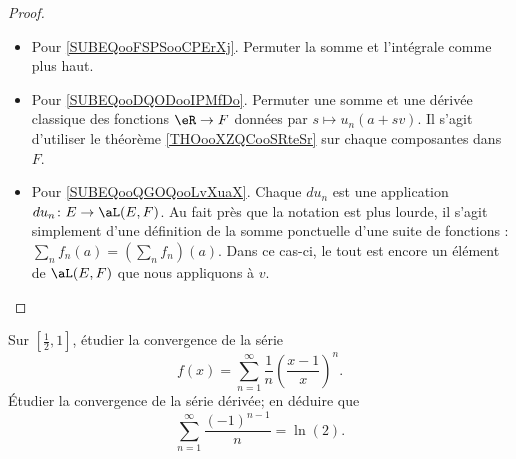 \begin{proof}
\begin{subproof}
\begin{itemize}
			\item Pour \ref{SUBEQooFSPSooCPErXj}. Permuter la somme et l'intégrale comme plus haut.
			\item Pour \ref{SUBEQooDQODooIPMfDo}. Permuter une somme et une dérivée classique des fonctions \( \eR\to F\) données par \( s\mapsto u_n(a+sv)\). Il s'agit d'utiliser le théorème \ref{THOooXZQCooSRteSr} sur chaque composantes dans \( F\).
			\item Pour \ref{SUBEQooQGOQooLvXuaX}. Chaque \( du_n\) est une application \( du_n\colon E\to \aL(E,F)\). Au fait près que la notation est plus lourde, il s'agit simplement d'une définition de la somme ponctuelle d'une suite de fonctions : \( \sum_nf_n(a)=(\sum_nf_n)(a)\). Dans ce cas-ci, le tout est encore un élément de \( \aL(E,F)\) que nous appliquons à \( v\).
		\end{itemize}
	\end{subproof}
\end{proof}


\begin{lemma}       \label{LEMooRIQTooLomsqD}
	Sur $[\frac{ 1 }{2},1]$, étudier la convergence de la série
	\begin{equation}
		f(x)=\sum_{n=1}^{\infty}\frac{1}{ n }\left( \frac{ x-1 }{ x } \right)^n.
	\end{equation}
	Étudier la convergence de la série dérivée; en déduire que
	\begin{equation}
		\sum_{n=1}^{\infty}\frac{ (-1)^{n-1} }{ n }=\ln(2).
	\end{equation}
\end{lemma}


